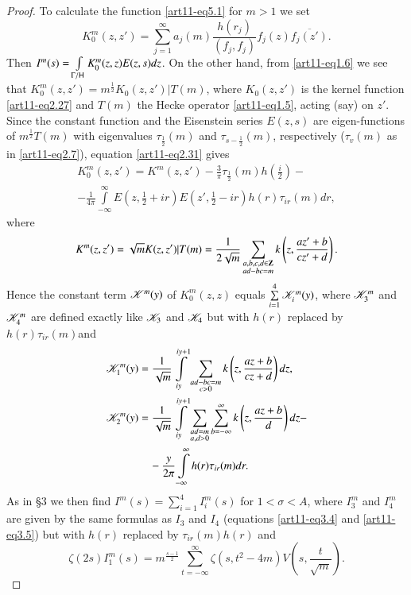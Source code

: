 \begin{proof}
To calculate the function \eqref{art11-eq5.1} for $m >1$ we set 
$$
K^m_0 (z,z') = \sum\limits^\infty_{j=1} a_j(m) \frac{h(r_j)}{(f_j, f_j)} f_j (z) \overline{f_j (z')}. 
$$ 
Then $I^m (s) = \int\limits_{\Gamma / \mathsf{H}} K^m_0 (z,z) E (z,s)dz$. On the other hand, from \eqref{art11-eq1.6} we see that $K^m_0 (z,z') = m^{\frac{1}{2}} K_0 (z,z') | T (m)$, where $K_0 (z,z')$ is the kernel function \eqref{art11-eq2.27} and $T(m)$ the Hecke operator \eqref{art11-eq1.5}, acting (say) on $z'$. Since the constant function and the Eisenstein series $E(z,s)$ are eigen-functions of $m^{\frac{1}{2}} T(m)$ with eigenvalues $\tau_{\frac{1}{2}} (m)$ and $\tau_{s-\frac{1}{2}} (m)$, respectively ($\tau_v (m)$ as in \eqref{art11-eq2.7}), equation \eqref{art11-eq2.31} gives
\begin{multline*}
K^m_0 (z,z') = K^m (z,z') - \frac{3}{\pi} \tau_{\frac{1}{2}} (m) h \left(\frac{i}{2} \right) -\\
- \frac{1}{4 \pi} \int\limits^\infty_{-\infty} E(z, \frac{1}{2} + ir) E (z' , \frac{1}{2}  - ir) h (r) \tau_{ir} (m) dr, 
\end{multline*}
 where
$$
K^m (z,z') = \sqrt{m} K (z,z') | T (m) = \frac{1}{2\sqrt{m}} \sum\limits_{\substack{a,b,c,d\in\mathbf{Z}\\ ad - bc =m}} k \left(z, \frac{az' + b}{ cz' + d} \right).
$$
Hence the constant term $\mathscr{K}^m (y)$ of $K^m_0(z,z)$ equals $\sum\limits^4_{i=1} \mathscr{K}^m_i (y)$, where $\mathscr{K}^m_3$ and $\mathscr{K}^m_4$ are defined exactly like $\mathscr{K}_3$ and $\mathscr{K}_4$ but with $h(r)$ replaced  by $h(r) \tau_{ir} (m)$\pageoriginale and
\begin{align*}
\mathscr{K}^m_1 (y) &= \frac{1}{\sqrt{m}} \int\limits^{iy+1}_{iy} \sum\limits_{\substack{ad- bc=m\\c>0}} k \left(z, \frac{az+b}{cz+d} \right)  dz,\\
\mathscr{K}^m_2 (y) &= \frac{1}{\sqrt{m}}  \int\limits^{iy+1}_{iy} \sum\limits_{\substack{ad = m\\a,d>0}} \sum\limits^\infty_{b=-\infty} k \left(z, \frac{az+b}{d} \right) dz - \\
&  \quad  - \frac{y}{2 \pi} \int\limits^\infty_{-\infty} h(r) \tau_{ir} (m) dr. 
\end{align*}
As in \S 3 we then find $I^m(s) = \sum\limits^4_{i=1} I^m_i (s)$ for $1<\sigma <A$, where $I^m_3$ and $I^m_4$ are given by the same formulas as $I_3$ and $I_4$ (equations \eqref{art11-eq3.4} and \eqref{art11-eq3.5}) but with $h(r)$ replaced by $\tau_{ir} (m) h(r)$ and 
$$
\zeta(2s) I^m_1 (s) = m^{\frac{s-1}{2}} \sum\limits^\infty_{t = - \infty} \zeta (s, t^2 - 4 m) V \left(s, \frac{t}{\sqrt{m}}\right).
$$
\end{proof}
